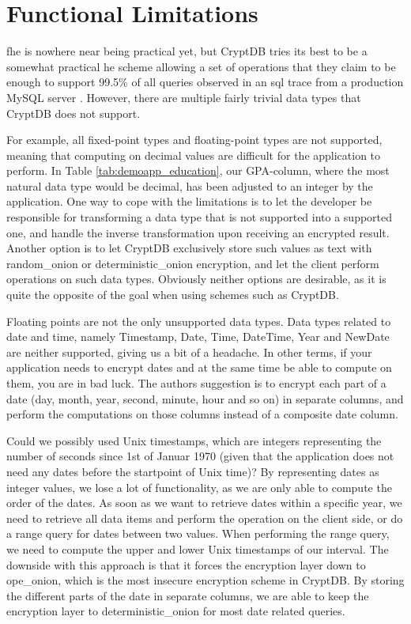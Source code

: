 \section{Functional Limitations}
\label{sec:limits}

\gls{fhe} is nowhere near being practical yet, but CryptDB tries its best to be a somewhat practical \gls{he} scheme allowing a set of operations that they claim to be enough to support 99.5\% of all queries observed in an \gls{sql} trace from a production MySQL server \citep{CryptDB_Main_Paper}. However, there are multiple fairly trivial data types that CryptDB does not support.

For example, all fixed-point types and floating-point types are not supported, meaning that computing on decimal values are difficult for the application to perform. In Table \ref{tab:demoapp_education}, our GPA-column, where the most natural data type would be decimal, has been adjusted to an integer by the application. One way to cope with the limitations is to let the developer be responsible for transforming a data type that is not supported into a supported one, and handle the inverse transformation upon receiving an encrypted result. Another option is to let CryptDB exclusively store such values as text with \gls{random_onion} or \gls{deterministic_onion} encryption, and let the client perform operations on such data types. Obviously neither options are desirable, as it is quite the opposite of the goal when using schemes such as CryptDB. 

Floating points are not the only unsupported data types. Data types related to date and time, namely Timestamp, Date, Time, DateTime, Year and NewDate are neither supported, giving us a bit of a headache. In other terms, if your application needs to encrypt dates and at the same time be able to compute on them, you are in bad luck. The authors suggestion is to encrypt each part of a date (day, month, year, second, minute, hour and so on) in separate columns, and perform the computations on those columns instead of a composite date column.

Could we possibly used Unix timestamps, which are integers representing the number of seconds since 1st of Januar 1970 (given that the application does not need any dates before the startpoint of Unix time)? By representing dates as integer values, we lose a lot of functionality, as we are only able to compute the order of the dates. As soon as we want to retrieve dates within a specific year, we need to retrieve all data items and perform the operation on the client side, or do a range query for dates between two values. When performing the range query, we need to compute the upper and lower Unix timestamps of our interval. The downside with this approach is that it forces the encryption layer down to \gls{ope_onion}, which is the most insecure encryption scheme in CryptDB. By storing the different parts of the date in separate columns, we are able to keep the encryption layer to \gls{deterministic_onion} for most date related queries. 

